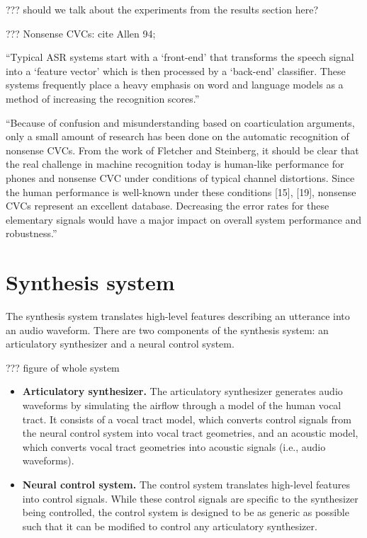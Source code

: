 ??? should we talk about the experiments from the results section here?

??? Nonsense CVCs: cite Allen 94;

``Typical ASR systems start with a `front-end' that transforms
the speech signal into a `feature vector' which is then processed
by a `back-end' classifier. These systems frequently place a
heavy emphasis on word and language models as a method of
increasing the recognition scores.''

``Because of confusion and misunderstanding based on
coarticulation arguments, only a small amount of research
has been done on the automatic recognition of nonsense CVCs.
From the work of Fletcher and Steinberg, it should be clear
that the real challenge in machine recognition today is
human-like performance for phones and nonsense CVC
under conditions of typical channel distortions.
Since the human performance is well-known under
these conditions [15], [19], nonsense CVCs
represent an excellent database. Decreasing
the error rates for these elementary signals would have
a major impact on overall system performance and robustness.''

\section{Synthesis system}

The synthesis system translates
high-level features describing an utterance
into an audio waveform.
There are two components of the synthesis system:
an articulatory synthesizer and a neural control system.

??? figure of whole system

\begin{itemize}
\item \textbf{Articulatory synthesizer.} The articulatory synthesizer
  generates audio waveforms
  by simulating the airflow through a model of the human vocal tract.
  It consists of a vocal tract model,
  which converts control signals from the neural control system
  into vocal tract geometries,
  and an acoustic model,
  which converts vocal tract geometries into acoustic signals
  (i.e., audio waveforms).
\item \textbf{Neural control system.} The control system
  translates high-level features into control signals.
  While these control signals are specific to the
  synthesizer being controlled,
  the control system is designed to be as generic
  as possible such that it can be modified to control
  any articulatory synthesizer.
\end{itemize}

